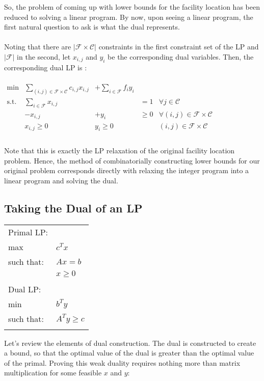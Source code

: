 \documentclass[11pt]{article}
\newcommand{\scf}{\ensuremath{\mathcal{F}}\xspace}
\newcommand{\scc}{\ensuremath{\mathcal{C}}\xspace}
\begin{document}
So, the problem of coming up with lower bounds for the facility
location has been reduced to solving a linear program. By now, upon
seeing a linear program, the first natural question to ask is what
the dual represents.\\
\\
Noting that there are $|\scf\times\scc|$ constraints in the first
constraint set of the LP and $|\scf|$ in the second, let $x_{i,j}$
and $y_i$ be the corresponding dual variables. Then, the
corresponding dual LP is :\\
\\

$\begin{array}{lrrll} \min & \sum_{(i,j)\in\scf\times\scc}
c_{i,j}x_{i,j}& + \sum_{i\in\scf}f_iy_i &&\\
\mbox{s.t.}& \sum_{i\in\scf}x_{i,j}&&=1&\forall j\in\scc\\
& -x_{i,j}&+y_i&\geq 0&\forall (i,j)\in\scf\times\scc\\
&x_{i,j}\geq 0& y_i\geq 0&& (i,j)\in\scf\times\scc\\
\end{array}$\\
\\
Note that this is exactly the LP relaxation of the original facility
location problem. Hence, the method of combinatorially constructing
lower bounds for our original problem corresponds directly with
relaxing the integer program into a linear program and solving the
dual.

\subsection*{Taking the Dual of an LP}

\noindent\begin{tabular}{ll}
\\
Primal LP:\\
max & $c^Tx$\\
such that: & $Ax = b$ \\
 & $x \geq 0$ \\
\\
Dual LP:\\
min & $b^Ty$\\
such that: & $A^Ty \geq c$ \\
\\
\end{tabular}

Let's review the elements of dual construction. The dual is
constructed to create a bound, so that the optimal value of the dual
is greater than the optimal value of the primal. Proving this weak
duality requires nothing more than matrix multiplication for some
feasible $x$ and $y$:
\end{document}
